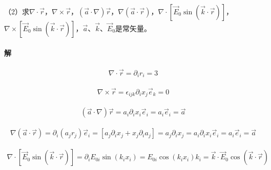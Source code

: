 \documentclass{article}
\begin{document}
（2）求$\nabla \cdot \vec{r}$，$\nabla \times \vec{r}$，$\left( \vec{a} \cdot \nabla \right) \vec{r}$，$\nabla \left( \vec{a} \cdot \vec{r} \right)$，$\nabla \cdot \left[ \vec{E}_0 \sin \left( \vec{k} \cdot \vec{r} \right) \right]$，$\nabla \times \left[ \vec{E}_0 \sin \left( \vec{k} \cdot \vec{r} \right) \right]$，$\vec{a}$、$\vec{k}$、$\vec{E}_0$是常矢量。

\paragraph{解}

\begin{equation*}
  \begin{aligned}
    \nabla \cdot \vec{r} = \partial_i r_i = 3
  \end{aligned}
\end{equation*}

\begin{equation*}
  \begin{aligned}
    \nabla \times \vec{r} = \epsilon_{ijk} \partial_i x_j \vec{e}_k = 0
  \end{aligned}
\end{equation*}

\begin{equation*}
  \begin{aligned}
    \left( \vec{a} \cdot \nabla \right) \vec{r} = a_i \partial_i x_i \vec{e}_i = a_i \vec{e}_i = \vec{a}
  \end{aligned}
\end{equation*}

\begin{equation*}
  \begin{aligned}
    \nabla \left( \vec{a} \cdot \vec{r} \right) = \partial_i \left( a_j r_j \right) \vec{e}_i = \left[ a_j \partial_i x_j + x_j \partial_i a_j \right] = a_j \partial_i x_j = a_i \partial_i x_i \vec{e}_i = a_i \vec{e}_i = \vec{a}
  \end{aligned}
\end{equation*}

\begin{equation*}
  \begin{aligned}
    \nabla \cdot \left[ \vec{E}_0 \sin \left( \vec{k} \cdot \vec{r} \right) \right] = \partial_i E_{0i} \sin \left( k_i x_i \right) = E_{0i} \cos \left( k_i x_i \right) k_i = \vec{k} \cdot \vec{E}_0 \cos \left( \vec{k} \cdot \vec{r} \right) 
  \end{aligned}
\end{equation*}
\end{document}
